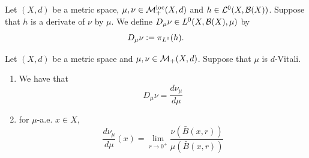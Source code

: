 \documentclass{book}
\begin{document}
	\begin{defn} 
		Let $(X, d)$ be a metric space, $\mu, \nu \in \mathcal{M}_+^{\text{loc}}(X, d)$ and $h \in \mathcal{L}^0(X, \mathcal{B}(X))$. Suppose that $h$ is a derivate of $\nu$ by $\mu$. We define $D_{\mu} \nu \in L^0(X, \mathcal{B}(X), \mu)$ by $$D_{\mu} \nu \vcentcolon= \pi_{L^0}(h).$$ 
	\end{defn}

	\begin{ex} 
		Let $(X, d)$ be a metric space and $\mu, \nu \in \mathcal{M}_+(X, d)$. Suppose that $\mu$ is $d$-Vitali.
		\begin{enumerate}
			\item We have that 
			$$D_{\mu} \nu = \frac{d\nu_{\mu}}{d\mu}$$
			\item for $\mu$-a.e. $x \in X$, 
			$$\frac{d\nu_{\mu}}{d\mu}(x) = \lim_{r \rightarrow 0^+} \frac{ \nu(\bar{B}(x, r))}{\mu(\bar{B}(x, r))}$$
		\end{enumerate}
	\end{ex}
	
\end{document}
